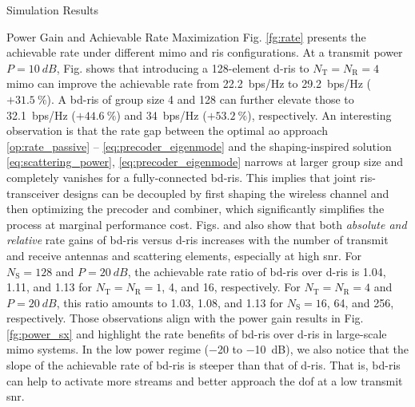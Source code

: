\documentclass[journal]{IEEEtran}
\begin{document}
\begin{section}{Simulation Results}
\begin{subsection}{Power Gain and Achievable Rate Maximization}
		Fig. \ref{fg:rate} presents the achievable rate under different \gls{mimo} and \gls{ris} configurations.
		At a transmit power $P = \qty{10}{dB}$, Fig.  shows that introducing a 128-element \gls{d}-\gls{ris} to $N_\mathrm{T}=N_\mathrm{R}=4$ \gls{mimo} can improve the achievable rate from \qty{22.2}{bps/Hz} to \qty{29.2}{bps/Hz} ($+\qty{31.5}{\percent}$).
		A \gls{bd}-\gls{ris} of group size 4 and 128 can further elevate those to \qty{32.1}{bps/Hz} ($+\qty{44.6}{\percent}$) and \qty{34}{bps/Hz}  ($+\qty{53.2}{\percent}$), respectively.
		An interesting observation is that the rate gap between the optimal \gls{ao} approach \eqref{op:rate_passive} -- \eqref{eq:precoder_eigenmode} and the shaping-inspired solution \eqref{eq:scattering_power}, \eqref{eq:precoder_eigenmode} narrows at larger group size and completely vanishes for a fully-connected \gls{bd}-\gls{ris}.
		This implies that joint \gls{ris}-transceiver designs can be decoupled by first shaping the wireless channel and then optimizing the precoder and combiner, which significantly simplifies the process at marginal performance cost.
		Figs.  and  also show that both \emph{absolute and relative} rate gains of \gls{bd}-\gls{ris} versus \gls{d}-\gls{ris}
		increases with the number of transmit and receive antennas and scattering elements, especially at high \gls{snr}.
		For $N_\mathrm{S}=128$ and $P = \qty{20}{dB}$,
		the achievable rate ratio of \gls{bd}-\gls{ris} over \gls{d}-\gls{ris} is \num{1.04}, \num{1.11}, and \num{1.13} for $N_\mathrm{T}=N_\mathrm{R}=1$, \num{4}, and \num{16}, respectively.
		For $N_\mathrm{T}=N_\mathrm{R}=4$ and $P = \qty{20}{dB}$, this ratio amounts to \num{1.03}, \num{1.08}, and \num{1.13} for $N_\mathrm{S}=16$, \num{64}, and \num{256}, respectively.
		Those observations align with the power gain results in Fig. \ref{fg:power_sx} and highlight the rate benefits of \gls{bd}-\gls{ris} over \gls{d}-\gls{ris} in large-scale \gls{mimo} systems.
		In the low power regime (\num{-20} to \qty{-10}{dB}), we also notice that the slope of the achievable rate of \gls{bd}-\gls{ris} is steeper than that of \gls{d}-\gls{ris}.
		That is, \gls{bd}-\gls{ris} can help to activate more streams and better approach the \gls{dof} at a low transmit \gls{snr}.

\end{subsection}
\end{section}
\end{document}
